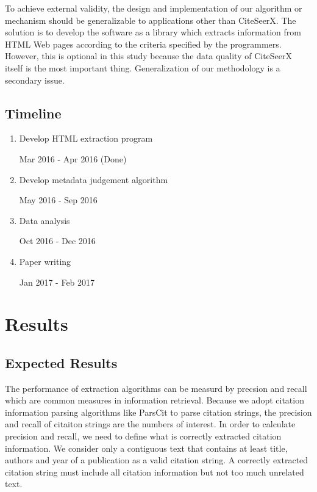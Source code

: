 \documentclass[prodmode]{acmsmall} %
\begin{document}
To achieve external validity, the design and implementation of our algorithm or mechanism should be generalizable to applications other than CiteSeerX. The solution is to develop the software as a library which extracts information from HTML Web pages according to the criteria specified by the programmers. However, this is optional in this study because the data quality of CiteSeerX itself is the most important thing. Generalization of our methodology is a secondary issue.

\subsection{Timeline}

\begin{enumerate}
\item Develop HTML extraction program

Mar 2016 - Apr 2016 (Done)

\item Develop metadata judgement algorithm

May 2016 - Sep 2016

\item Data analysis

Oct 2016 - Dec 2016

\item Paper writing

Jan 2017 - Feb 2017
\end{enumerate}

\section{Results}

\subsection{Expected Results}

The performance of extraction algorithms can be measurd by precsion and recall which are common measures in information retrieval. Because we adopt citation information parsing algorithms like ParsCit to parse citation strings, the precision and recall of citaiton strings are the numbers of interest. In order to calculate precision and recall, we need to define what is correctly extracted citation information. We consider only a contiguous text that contains at least title, authors and year of a publication as a valid citation string. A correctly extracted citation string must include all citation information but not too much unrelated text.
\end{document}
